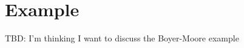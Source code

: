 \section{Example}\label{sec:example}

TBD: I'm thinking I want to discuss the Boyer-Moore example 


